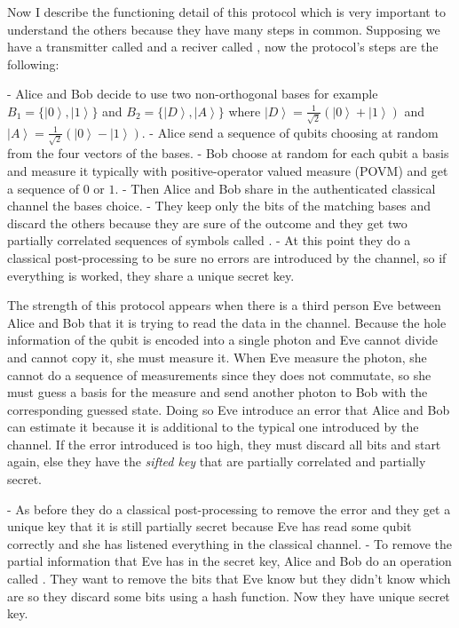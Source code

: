 Now I describe the functioning detail of this protocol which is very important to understand the others because they have many steps in common. Supposing we have a transmitter called  and a reciver called , now the protocol's steps are the following:

- Alice and Bob decide to use two non-orthogonal bases for example $B_1 = \{\left|0\right>, \left|1\right>\}$ and $B_2 = \{\left|D\right>, \left|A\right>\}$ where $\left|D\right> = \frac{1}{\sqrt{2}} (\left|0\right> + \left|1\right>)$ and $\left|A\right> = \frac{1}{\sqrt{2}} (\left|0\right> - \left|1\right>)$.
- Alice send a sequence of qubits choosing at random from the four vectors of the bases.
- Bob choose at random for each qubit a basis and measure it typically with positive-operator valued measure (POVM) and get a sequence of $0$ or $1$.
- Then Alice and Bob share in the authenticated classical channel the bases choice.
- They keep only the bits of the matching bases and discard the others because they are sure of the outcome and they get two partially correlated sequences of symbols called .
- At this point they do a classical post-processing to be sure no errors are introduced by the channel, so if everything is worked, they share a unique secret key.

The strength of this protocol appears when there is a third person Eve between Alice and Bob that it is trying to read the data in the channel. Because the hole information of the qubit is encoded into a single photon and Eve cannot divide and cannot copy it, she must measure it. When Eve measure the photon, she cannot do a sequence of measurements since they does not commutate, so she must guess a basis for the measure and send another photon to Bob with the corresponding guessed state. Doing so Eve introduce an error that Alice and Bob can estimate it because it is additional to the typical one introduced by the channel. If the error introduced is too high, they must discard all bits and start again, else they have the \textit{sifted key} that are partially correlated and partially secret.

- As before they do a classical post-processing to remove the error and they get a unique key that it is still partially secret because Eve has read some qubit correctly and she has listened everything in the classical channel.
- To remove the partial information that Eve has in the secret key, Alice and Bob do an operation called . They want to remove the bits that Eve know but they didn't know which are so they discard some bits using a hash function. Now they have unique secret key.


